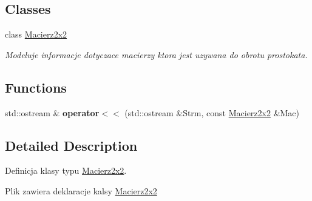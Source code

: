 \subsection*{Classes}
\begin{DoxyCompactItemize}
\item 
class \hyperlink{class_macierz2x2}{Macierz2x2}
\begin{DoxyCompactList}\small\item\em Modeluje informacje dotyczace macierzy ktora jest uzywana do obrotu prostokata. \end{DoxyCompactList}\end{DoxyCompactItemize}
\subsection*{Functions}
\begin{DoxyCompactItemize}
\item 
\hypertarget{_macierz2x2_8hh_aa3eba72acf9e09b901351ce2bc5edf2f}{std\+::ostream \& {\bfseries operator$<$$<$} (std\+::ostream \&Strm, const \hyperlink{class_macierz2x2}{Macierz2x2} \&Mac)}\label{_macierz2x2_8hh_aa3eba72acf9e09b901351ce2bc5edf2f}

\end{DoxyCompactItemize}


\subsection{Detailed Description}
Definicja klasy typu \hyperlink{class_macierz2x2}{Macierz2x2}. 

Plik zawiera deklaracje kalsy \hyperlink{class_macierz2x2}{Macierz2x2} 